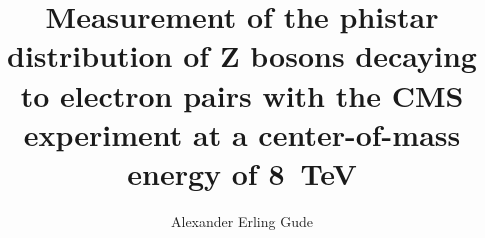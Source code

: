 \phd %

\title{
    \textbf{
        Measurement of the phistar distribution of Z bosons decaying to
        electron pairs with the CMS experiment at a center-of-mass energy of
        8~TeV
    }
}
\author{Alexander Erling Gude}


\abstract{}
\copyrightpage
\acknowledgements{}
\dedication{}

\beforepreface

\figurespage
\tablespage

\afterpreface
